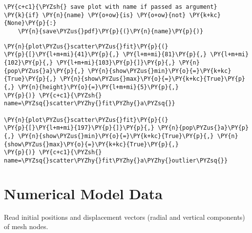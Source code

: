 \begin{tcolorbox}[breakable, size=fbox, boxrule=1pt, pad at break*=1mm,colback=cellbackground, colframe=cellborder]
\begin{Verbatim}[commandchars=\\\{\}]
\PY{c+c1}{\PYZsh{} save plot with name if passed as argument}
\PY{k}{if} \PY{n}{name} \PY{o+ow}{is} \PY{o+ow}{not} \PY{k+kc}{None}\PY{p}{:}
    \PY{n}{save\PYZus{}pdf}\PY{p}{(}\PY{n}{name}\PY{p}{)}
\end{Verbatim}
\end{tcolorbox}

\begin{tcolorbox}[breakable, size=fbox, boxrule=1pt, pad at break*=1mm,colback=cellbackground, colframe=cellborder]
\begin{Verbatim}[commandchars=\\\{\}]
\PY{n}{plot\PYZus{}scatter\PYZus{}fit}\PY{p}{(}
\PY{p}{[}\PY{l+m+mi}{41}\PY{p}{,} \PY{l+m+mi}{81}\PY{p}{,} \PY{l+m+mi}{102}\PY{p}{,} \PY{l+m+mi}{103}\PY{p}{]}\PY{p}{,} \PY{n}{pop\PYZus{}a}\PY{p}{,} \PY{n}{show\PYZus{}min}\PY{o}{=}\PY{k+kc}{True}\PY{p}{,} \PY{n}{show\PYZus{}max}\PY{o}{=}\PY{k+kc}{True}\PY{p}{,} \PY{n}{height}\PY{o}{=}\PY{l+m+mi}{5}\PY{p}{,}
\PY{p}{)} \PY{c+c1}{\PYZsh{} name=\PYZsq{}scatter\PYZhy{}fit\PYZhy{}a\PYZsq{}}

\PY{n}{plot\PYZus{}scatter\PYZus{}fit}\PY{p}{(}
\PY{p}{[}\PY{l+m+mi}{197}\PY{p}{]}\PY{p}{,} \PY{n}{pop\PYZus{}a}\PY{p}{,} \PY{n}{show\PYZus{}min}\PY{o}{=}\PY{k+kc}{True}\PY{p}{,} \PY{n}{show\PYZus{}max}\PY{o}{=}\PY{k+kc}{True}\PY{p}{,}
\PY{p}{)} \PY{c+c1}{\PYZsh{} name=\PYZsq{}scatter\PYZhy{}fit\PYZhy{}a\PYZhy{}outlier\PYZsq{}}
\end{Verbatim}
\end{tcolorbox}

\hypertarget{numerical-model-data}{%
\section{Numerical Model Data}\label{numerical-model-data}}

Read initial positions and displacement vectors (radial and vertical
components) of mesh nodes.


